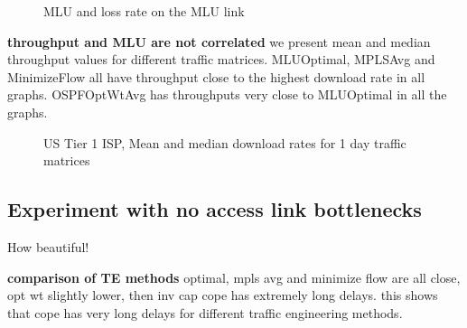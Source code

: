 \documentclass[a4paper,10pt]{article}
\begin{document}
\begin{figure}[htp]
  \begin{center}
  \end{center}
  \caption{MLU and loss rate on the MLU link}
  \label{fig:US_ISP_MLU}
\end{figure}


\textbf{throughput and MLU are not correlated} we present mean  and median throughput values for different traffic matrices. MLUOptimal, MPLSAvg and MinimizeFlow all have throughput close to the highest download rate in all graphs. OSPFOptWtAvg has throughputs very close to MLUOptimal in all the graphs.

\begin{figure}[htp]
  \begin{center}
  \end{center}
  \caption{US Tier 1 ISP, Mean and median download rates for 1 day traffic matrices}
  \label{fig:US_ISP_download_rate_percentile}
\end{figure}

\subsection{Experiment with no access link bottlenecks}

How beautiful!

\textbf{comparison of TE methods} optimal, mpls avg and minimize flow are all close, opt wt slightly lower, then inv cap cope has extremely long delays. this shows that cope has very long delays for different traffic engineering methods. 
\end{document}
